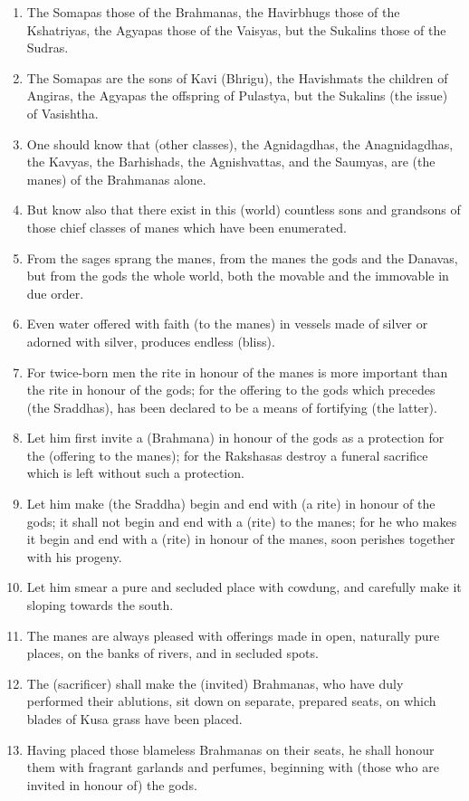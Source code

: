 \begin{enumerate}
\item The Somapas those of the Brahmanas, the Havirbhugs those of the Kshatriyas, the Agyapas those of the Vaisyas, but the Sukalins those of the Sudras.
\item The Somapas are the sons of Kavi (Bhrigu), the Havishmats the children of Angiras, the Agyapas the offspring of Pulastya, but the Sukalins (the issue) of Vasishtha.
\item One should know that (other classes), the Agnidagdhas, the Anagnidagdhas, the Kavyas, the Barhishads, the Agnishvattas, and the Saumyas, are (the manes) of the Brahmanas alone.
\item But know also that there exist in this (world) countless sons and grandsons of those chief classes of manes which have been enumerated.
\item From the sages sprang the manes, from the manes the gods and the Danavas, but from the gods the whole world, both the movable and the immovable in due order.
\item Even water offered with faith (to the manes) in vessels made of silver or adorned with silver, produces endless (bliss).
\item For twice-born men the rite in honour of the manes is more important than the rite in honour of the gods; for the offering to the gods which precedes (the Sraddhas), has been declared to be a means of fortifying (the latter).
\item Let him first invite a (Brahmana) in honour of the gods as a protection for the (offering to the manes); for the Rakshasas destroy a funeral sacrifice which is left without such a protection.
\item Let him make (the Sraddha) begin and end with (a rite) in honour of the gods; it shall not begin and end with a (rite) to the manes; for he who makes it begin and end with a (rite) in honour of the manes, soon perishes together with his progeny.
\item Let him smear a pure and secluded place with cowdung, and carefully make it sloping towards the south.
\item The manes are always pleased with offerings made in open, naturally pure places, on the banks of rivers, and in secluded spots.
\item The (sacrificer) shall make the (invited) Brahmanas, who have duly performed their ablutions, sit down on separate, prepared seats, on which blades of Kusa grass have been placed.
\item Having placed those blameless Brahmanas on their seats, he shall honour them with fragrant garlands and perfumes, beginning with (those who are invited in honour of) the gods.

\end{enumerate}
